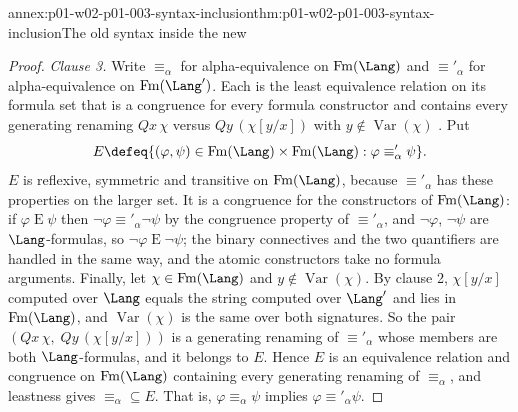 \begin{annexitem}{annex:p01-w02-p01-003-syntax-inclusion}{thm:p01-w02-p01-003-syntax-inclusion}{The old syntax inside the new}
\begin{proof}
\emph{Clause 3.} Write \(\equiv_\alpha\) for alpha-equivalence on
\(\operatorname{Fm}(\Lang)\) and \(\equiv'_\alpha\) for alpha-equivalence on
\(\operatorname{Fm}(\Lang')\). Each is the least equivalence relation on its
formula set that is a congruence for every formula constructor and contains
every generating renaming \(Qx\,\chi\) versus \(Qy\,(\chi[y/x])\) with
\(y\notin\operatorname{Var}(\chi)\)
\cite[ch.~``First-Order Syntax'', definition
``Alpha-equivalence'']{FrozenFormalLogicLanguageChange}. Put
\[
 E\defeq\{(\varphi,\psi)\in\operatorname{Fm}(\Lang)\times\operatorname{Fm}(\Lang):
          \varphi\equiv'_\alpha\psi\}.
\]
\(E\) is reflexive, symmetric and transitive on \(\operatorname{Fm}(\Lang)\),
because \(\equiv'_\alpha\) has these properties on the larger set. It is a
congruence for the constructors of \(\operatorname{Fm}(\Lang)\): if
\(\varphi\mathrel E\psi\) then \(\neg\varphi\equiv'_\alpha\neg\psi\) by the
congruence property of \(\equiv'_\alpha\), and \(\neg\varphi\),
\(\neg\psi\) are \(\Lang\)-formulas, so \(\neg\varphi\mathrel E\neg\psi\);
the binary connectives and the two quantifiers are handled in the same way,
and the atomic constructors take no formula arguments. Finally, let
\(\chi\in\operatorname{Fm}(\Lang)\) and \(y\notin\operatorname{Var}(\chi)\).
By clause 2, \(\chi[y/x]\) computed over \(\Lang\) equals the string computed
over \(\Lang'\) and lies in \(\operatorname{Fm}(\Lang)\), and
\(\operatorname{Var}(\chi)\) is the same over both signatures. So the pair
\((Qx\,\chi,\;Qy\,(\chi[y/x]))\) is a generating renaming of
\(\equiv'_\alpha\) whose members are both \(\Lang\)-formulas, and it belongs
to \(E\). Hence \(E\) is an equivalence relation and congruence on
\(\operatorname{Fm}(\Lang)\) containing every generating renaming of
\(\equiv_\alpha\), and leastness gives \({\equiv_\alpha}\subseteq E\). That is,
\(\varphi\equiv_\alpha\psi\) implies \(\varphi\equiv'_\alpha\psi\).
\end{proof}
\end{annexitem}

